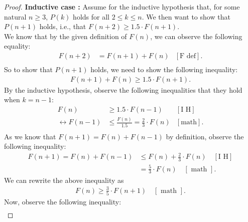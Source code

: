 \documentclass[10pt]{article}
\begin{document}
\begin{enumerate}[label={}]
\begin{proof}
              \textbf{Inductive case :} Assume for the inductive hypothesis that, for some natural $n \geq 3$, $P(k)$ holds for all $2 \leq k \leq n$. We then want to show that $P(n+1)$ holds, i.e., that $F(n+2) \geq 1.5 \cdot F(n+1)$.\\
              We know that by the given definition of $F(n)$, we can observe the following equality:
              $$
                  \begin{aligned}
                      F(n+2) & =F(n+1)+F(n) & {\left[\text {F def}\right] }. \\
                  \end{aligned}
              $$
              So to show that $P(n+1)$ holds, we need to show the following inequality:
              $$
                  \begin{aligned}
                      F(n+1)+F(n) \geq 1.5 \cdot F(n+1).
                  \end{aligned}
              $$
              By the inductive hypothesis, observe the following inequalities that they hold when $k=n-1$:
              $$
                  \begin{aligned}
                      F(n)                       & \geq 1.5 \cdot F(n-1)                        & {\left[\text {I H}\right] }   \\
                      \longleftrightarrow F(n-1) & \leq \frac{F(n)}{1.5}=\frac{2}{3} \cdot F(n) & {\left[\text {math}\right] }. \\
                  \end{aligned}
              $$
              As we know that $F(n+1)=F(n)+F(n-1)$ by definition, observe the following inequality:
              $$
                  \begin{aligned}
                      F(n+1)=F(n)+F(n-1) & \leq F(n)+\frac{2}{3} \cdot F(n) \quad\left[\text {I H}\right] \\
                                         & =\frac{5}{3} \cdot F(n) \quad[\text { math }] .
                  \end{aligned}
              $$
              We can rewrite the above inequality as
              $$
                  \begin{aligned}
                      F(n) \geq \frac{3}{5} \cdot F(n+1) \quad[\text { math }].
                  \end{aligned}
              $$
              Now, observe the following inequality:
              $$
                  \begin{aligned}

\end{aligned}$$
\end{proof}
\end{enumerate}
\end{document}

